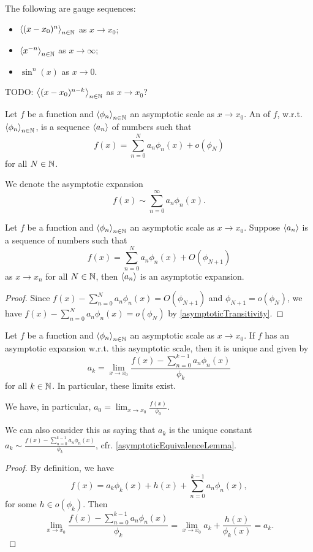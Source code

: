 \begin{example}
The following are gauge sequences:
\begin{itemize}
\item $\left\langle (x-x_0)^n \right\rangle_{n\in \mathbb{N}}$ as $x\to x_0$;
\item $\left\langle x^{-n} \right\rangle_{n\in \mathbb{N}}$ as $x\to \infty$;
\item $\sin^n(x)$ as $x\to 0$.
\end{itemize}
TODO: $\left\langle (x-x_0)^{n-k} \right\rangle_{n\in \mathbb{N}}$ as $x\to x_0$?
\end{example}

\begin{definition}
Let $f$ be a function and $\left\langle \phi_n \right\rangle_{n\in \mathbb{N}}$ an asymptotic scale as $x\to x_0$. An  of $f$, w.r.t. $\left\langle \phi_n \right\rangle_{n\in \mathbb{N}}$, is a sequence $\left\langle a_n \right\rangle$ of numbers such that
\[ f(x) = \sum_{n=0}^N a_n\phi_n(x) + o(\phi_{N}) \]
for all $N\in\mathbb{N}$.

We denote the asymptotic expansion
\[ f(x) \sim \sum_{n = 0}^\infty a_n\phi_n(x). \]
\end{definition}

\begin{lemma}
Let $f$ be a function and $\left\langle \phi_n \right\rangle_{n\in \mathbb{N}}$ an asymptotic scale as $x\to x_0$. Suppose $\left\langle a_n \right\rangle$ is a sequence of numbers such that
\[ f(x) = \sum_{n=0}^N a_n\phi_n(x) + O(\phi_{N+1}) \]
as $x\to x_n$ for all $N\in\mathbb{N}$, then $\left\langle a_n \right\rangle$ is an asymptotic expansion.
\end{lemma}
\begin{proof}
Since $f(x) - \sum_{n=0}^N a_n\phi_n(x) = O(\phi_{N+1})$ and $\phi_{N+1} = o(\phi_N)$, we have $f(x) - \sum_{n=0}^N a_n\phi_n(x) = o(\phi_{N})$ by \ref{asymptoticTransitivity}.
\end{proof}

\begin{lemma} \label{calculationAsymptoticExpansion}
Let $f$ be a function and $\left\langle \phi_n \right\rangle_{n\in \mathbb{N}}$ an asymptotic scale as $x\to x_0$. If $f$ has an asymptotic expansion w.r.t. this asymptotic scale, then it is unique and given by
\[ a_k = \lim_{x\to x_0}\frac{f(x) - \sum_{n=0}^{k-1}a_n\phi_n(x)}{\phi_k} \]
for all $k\in \mathbb{N}$. In particular, these limits exist.
\end{lemma}
We have, in particular, $a_0 = \lim_{x\to x_0}\frac{f(x)}{\phi_0}$.

We can also consider this as saying that $a_k$ is the unique constant $a_k \sim \frac{f(x) - \sum_{n=0}^{k-1}a_n\phi_n(x)}{\phi_k}$, cfr. \ref{asymptoticEquivalenceLemma}.
\begin{proof}
By definition, we have
\[ f(x) = a_k\phi_{k}(x) + h(x) + \sum_{n=0}^{k-1}a_n\phi_n(x), \]
for some $h \in o(\phi_k)$. Then
\[ \lim_{x\to x_0}\frac{f(x) - \sum_{n=0}^{k-1}a_n\phi_n(x)}{\phi_k} = \lim_{x\to x_0} a_k + \frac{h(x)}{\phi_k(x)} = a_k. \]
\end{proof}

